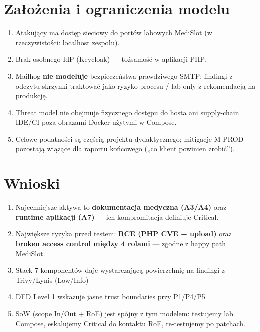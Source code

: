 \documentclass[11pt,a4paper]{article}
\begin{document}
\section{Założenia i ograniczenia modelu}
\begin{enumerate}[leftmargin=*]
  \item Atakujący ma dostęp sieciowy do portów labowych MediSlot (w rzeczywistości: localhost zespołu).
  \item Brak osobnego IdP (Keycloak) — tożsamość w aplikacji PHP.
  \item Mailhog \textbf{nie modeluje} bezpieczeństwa prawdziwego SMTP; findingi z odczytu skrzynki traktować jako ryzyko procesu / lab-only z rekomendacją na produkcję.
  \item Threat model nie obejmuje fizycznego dostępu do hosta ani supply-chain IDE/CI poza obrazami Docker użytymi w Compose.
  \item Celowe podatności są częścią projektu dydaktycznego; mitigacje M-PROD pozostają wiążące dla raportu końcowego („co klient powinien zrobić”).
\end{enumerate}

\section{Wnioski}
\begin{enumerate}[leftmargin=*]
  \item Najcenniejsze aktywa to \textbf{dokumentacja medyczna (A3/A4)} oraz \textbf{runtime aplikacji (A7)} — ich kompromitacja definiuje Critical.
  \item Największe ryzyka przed testem: \textbf{RCE (PHP CVE + upload)} oraz \textbf{broken access control między 4 rolami} — zgodne z happy path MediSlot.
  \item Stack 7 komponentów daje wystarczającą powierzchnię na findingi z Trivy/Lynis (Low/Info)
  \item DFD Level 1 wskazuje jasne trust boundaries przy P1/P4/P5
  \item SoW (scope In/Out + RoE) jest spójny z tym modelem: testujemy lab Compose, eskalujemy Critical do kontaktu RoE, re-testujemy po patchach.
\end{enumerate}
\end{document}
